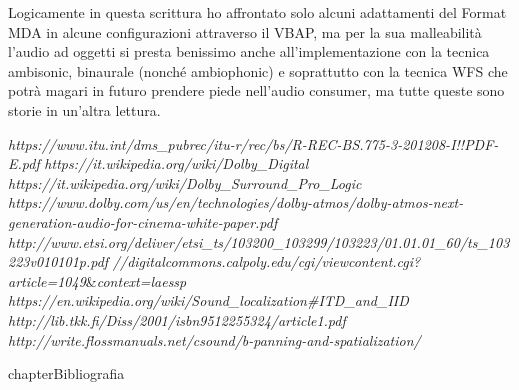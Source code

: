 \documentclass[12pt,a4paper]{report}
\begin{document}
Logicamente in questa scrittura ho affrontato solo alcuni adattamenti del Format MDA in alcune configurazioni attraverso il VBAP, ma per la sua malleabilità l'audio ad oggetti si presta benissimo anche all'implementazione con la tecnica ambisonic, binaurale (nonché ambiophonic) e soprattutto con la tecnica WFS che potrà magari in futuro prendere piede nell'audio consumer, ma tutte queste sono storie in un'altra lettura.




\begin{thebibliography}{}

 \textit{https://www.itu.int/dms\_pubrec/itu-r/rec/bs/R-REC-BS.775-3-201208-I!!PDF-E.pdf}
 \textit{https://it.wikipedia.org/wiki/Dolby\_Digital}
 \textit{https://it.wikipedia.org/wiki/Dolby\_Surround\_Pro\_Logic}
 \textit{https://www.dolby.com/us/en/technologies/dolby-atmos/dolby-atmos-next-generation-audio-for-cinema-white-paper.pdf}
\textit{http://www.etsi.org/deliver/etsi\_ts/103200\_103299/103223/01.01.01\_60/ts\_103223v010101p.pdf}
\textit{//digitalcommons.calpoly.edu/cgi/viewcontent.cgi?article=1049}\&\textit{context=laessp}
 \textit{https://en.wikipedia.org/wiki/Sound\_localization\#ITD\_and\_IID}
 \textit{http://lib.tkk.fi/Diss/2001/isbn9512255324/article1.pdf}
 \textit{http://write.flossmanuals.net/csound/b-panning-and-spatialization/}
\end{thebibliography}

 {chapter}{Bibliografia}
\end{document}
